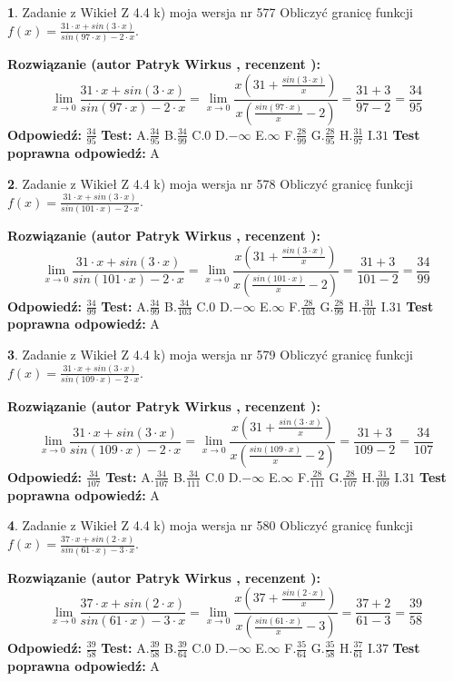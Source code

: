 \documentclass[12pt, a4paper]{article}
\theoremstyle{definition} %
\newtheorem{zad}{}
\newcommand{\zadStart}[1]{\begin{zad}#1\newline}
\newcommand{\zadStop}{\end{zad}}
\newcommand{\rozwStart}[2]{\noindent \textbf{Rozwiązanie (autor #1 , recenzent #2): }\newline}
\newcommand{\rozwStop}{\newline}
\newcommand{\odpStart}{\noindent \textbf{Odpowiedź:}\newline}
\newcommand{\odpStop}{\newline}
\newcommand{\testStart}{\noindent \textbf{Test:}\newline}
\newcommand{\testStop}{\newline}
\newcommand{\kluczStart}{\noindent \textbf{Test poprawna odpowiedź:}\newline}
\newcommand{\kluczStop}{\newline}
\begin{document}
\zadStart{Zadanie z Wikieł Z 4.4 k) moja wersja nr 577}
Obliczyć granicę funkcji $f(x)=\frac{31\cdot x +sin(3\cdot x)}{sin(97\cdot x) -2\cdot x}$.
\zadStop
\rozwStart{Patryk Wirkus}{}
$$\lim\limits_{x\to 0}\frac{31\cdot x +sin(3\cdot x)}{sin(97\cdot x) -2\cdot x}
=\lim\limits_{x\to 0}\frac{x(31+\frac{sin(3\cdot x)}{x})}{x(\frac{sin(97\cdot x)}{x}-2)}
=\frac{31+3}{97-2} = \frac{34}{95}$$
\rozwStop
\odpStart
$\frac{34}{95}$
\odpStop
\testStart
A.$\frac{34}{95}$
B.$\frac{34}{99}$
C.$0$
D.$-\infty$
E.$\infty$
F.$\frac{28}{99}$
G.$\frac{28}{95}$
H.$\frac{31}{97}$
I.$31$
\testStop
\kluczStart
A
\kluczStop



\zadStart{Zadanie z Wikieł Z 4.4 k) moja wersja nr 578}
Obliczyć granicę funkcji $f(x)=\frac{31\cdot x +sin(3\cdot x)}{sin(101\cdot x) -2\cdot x}$.
\zadStop
\rozwStart{Patryk Wirkus}{}
$$\lim\limits_{x\to 0}\frac{31\cdot x +sin(3\cdot x)}{sin(101\cdot x) -2\cdot x}
=\lim\limits_{x\to 0}\frac{x(31+\frac{sin(3\cdot x)}{x})}{x(\frac{sin(101\cdot x)}{x}-2)}
=\frac{31+3}{101-2} = \frac{34}{99}$$
\rozwStop
\odpStart
$\frac{34}{99}$
\odpStop
\testStart
A.$\frac{34}{99}$
B.$\frac{34}{103}$
C.$0$
D.$-\infty$
E.$\infty$
F.$\frac{28}{103}$
G.$\frac{28}{99}$
H.$\frac{31}{101}$
I.$31$
\testStop
\kluczStart
A
\kluczStop



\zadStart{Zadanie z Wikieł Z 4.4 k) moja wersja nr 579}
Obliczyć granicę funkcji $f(x)=\frac{31\cdot x +sin(3\cdot x)}{sin(109\cdot x) -2\cdot x}$.
\zadStop
\rozwStart{Patryk Wirkus}{}
$$\lim\limits_{x\to 0}\frac{31\cdot x +sin(3\cdot x)}{sin(109\cdot x) -2\cdot x}
=\lim\limits_{x\to 0}\frac{x(31+\frac{sin(3\cdot x)}{x})}{x(\frac{sin(109\cdot x)}{x}-2)}
=\frac{31+3}{109-2} = \frac{34}{107}$$
\rozwStop
\odpStart
$\frac{34}{107}$
\odpStop
\testStart
A.$\frac{34}{107}$
B.$\frac{34}{111}$
C.$0$
D.$-\infty$
E.$\infty$
F.$\frac{28}{111}$
G.$\frac{28}{107}$
H.$\frac{31}{109}$
I.$31$
\testStop
\kluczStart
A
\kluczStop



\zadStart{Zadanie z Wikieł Z 4.4 k) moja wersja nr 580}
Obliczyć granicę funkcji $f(x)=\frac{37\cdot x +sin(2\cdot x)}{sin(61\cdot x) -3\cdot x}$.
\zadStop
\rozwStart{Patryk Wirkus}{}
$$\lim\limits_{x\to 0}\frac{37\cdot x +sin(2\cdot x)}{sin(61\cdot x) -3\cdot x}
=\lim\limits_{x\to 0}\frac{x(37+\frac{sin(2\cdot x)}{x})}{x(\frac{sin(61\cdot x)}{x}-3)}
=\frac{37+2}{61-3} = \frac{39}{58}$$
\rozwStop
\odpStart
$\frac{39}{58}$
\odpStop
\testStart
A.$\frac{39}{58}$
B.$\frac{39}{64}$
C.$0$
D.$-\infty$
E.$\infty$
F.$\frac{35}{64}$
G.$\frac{35}{58}$
H.$\frac{37}{61}$
I.$37$
\testStop
\kluczStart
A
\kluczStop
\end{document}
